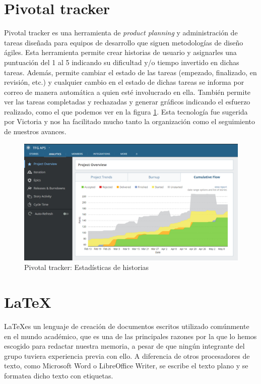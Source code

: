 \documentclass[11pt]{book}
\begin{document}
	\section{Pivotal tracker}
	Pivotal tracker es una herramienta de \emph{product planning} y administración de tareas diseñada para equipos de desarrollo que siguen metodologías de diseño ágiles.
	Esta herramienta permite crear historias de usuario y asignarles una puntuación del 1 al 5 indicando su dificultad y/o tiempo invertido en dichas tareas. Además, permite cambiar el estado de las tareas (empezado, finalizado, en revisión, etc.) y cualquier cambio en el estado de dichas tareas se informa por correo de manera automática a quien esté involucrado en ella.
	También permite ver las tareas completadas y rechazadas y generar gráficos indicando el esfuerzo realizado, como el que podemos ver en la figura \ref{Figura 2}. Esta tecnología fue sugerida por Victoria y nos ha facilitado mucho tanto la organización como el seguimiento de nuestros avances.
	
	\begin{figure}
		\centering
		\includegraphics[scale=0.6]{pivotal}
		\caption{Pivotal tracker: Estadísticas de historias}
		\label{Figura 2}
	\end{figure}
	
	\section{\LaTeX}
	\LaTeX es un lenguaje de creación de documentos escritos utilizado comúnmente en el mundo académico, que es una de las principales razones por la que lo hemos escogido para redactar nuestra memoria, a pesar de que ningún integrante del grupo tuviera experiencia previa con ello. A diferencia de otros procesadores de texto, como Microsoft Word o LibreOffice Writer, se escribe el texto plano y se formatea dicho texto con etiquetas. 
	
\end{document}
